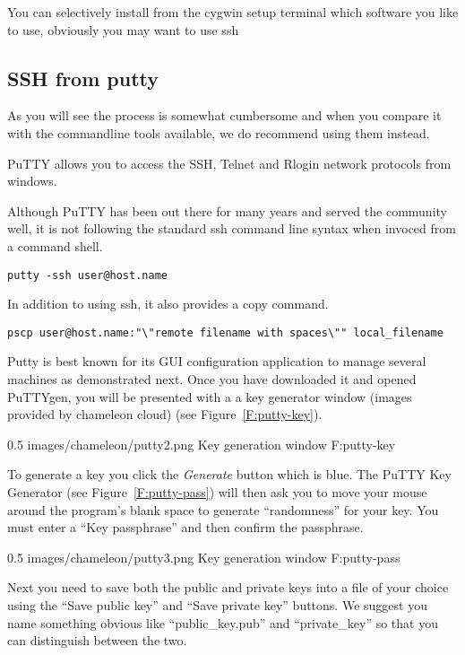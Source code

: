 You can selectively install from the cygwin setup terminal which
software you like to use, obviously you may want to use ssh

\subsection{SSH from putty}\label{S:putty}

As you will see the process is somewhat cumbersome and when you
compare it with the commandline tools available, we do recommend using
them instead.

PuTTY allows you to access the SSH, Telnet and Rlogin network
protocols from windows. 


Although PuTTY has been out there for many years and served the
community well, it is not following the standard ssh command line
syntax when invoced from a command shell.

\begin{verbatim}
putty -ssh user@host.name
\end{verbatim}

In addition to using ssh, it also provides a copy command.

\begin{verbatim}
pscp user@host.name:"\"remote filename with spaces\"" local_filename
\end{verbatim}

Putty is best known for its GUI configuration application to manage
several machines as demonstrated next. Once you have downloaded it and
opened PuTTYgen, you will be presented with a a key generator window
(images provided by chameleon cloud) (see Figure~\ref{F:putty-key}).

       {0.5}
       {images/chameleon/putty2.png}
       {Key generation window}
       {F:putty-key} 

To generate a key you click the \textit{Generate} button which is
blue. The PuTTY Key Generator (see Figure~\ref{F:putty-pass})
will then ask you to move your mouse around the program's blank
space to generate ``randomness'' for your key.  You must enter a
``Key passphrase'' and then confirm the passphrase.

       {0.5}
       {images/chameleon/putty3.png}
       {Key generation window}
       {F:putty-pass} 


Next you need to save both the public and private keys into a file of your choice using
the ``Save public key'' and ``Save private key'' buttons. We suggest
you name something obvious like ``public\_key.pub'' and ``private\_key'' so that you
can distinguish between the two.


